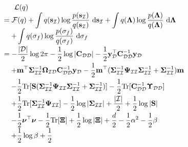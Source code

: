 \documentclass[conference]{IEEEtran}
\begin{document}
	\begin{equation*}
		\hspace{-1.7mm}
		\begin{array}{l}
			\displaystyle\hspace{5mm}\mathcal{L}(q)\vspace{0mm}\\
			\displaystyle= \mathcal{F}(q)+\int q(\mathbf{s}_\mathcal{I})\log\dfrac{p(\mathbf{s}_\mathcal{I})}{q(\mathbf{s}_\mathcal{I})}\ \mathrm{d}\mathbf{s}_\mathcal{I}+
			\int q(\mathbf{\Lambda})\log\dfrac{p(\mathbf{\Lambda})}{q(\mathbf{\Lambda})}\ \mathrm{d}\mathbf{\Lambda}\ \vspace{-0.5mm}\\
			\displaystyle\quad+\int q(\sigma_f)\log\dfrac{p(\sigma_f)}{q(\sigma_f)}\ \mathrm{d}\sigma_f\vspace{0.5mm}\\
			\displaystyle=-\frac{|\mathcal{D}|}{2}\log2\pi-\frac{1}{2}\log|\mathbf{C}_\mathcal{DD}|-\frac{1}{2}\mathbf{y}_\mathcal{D}^\top\mathbf{C}_\mathcal{DD}^{-1}\mathbf{y}_\mathcal{D}\vspace{1mm}\\
			\displaystyle\quad+\mathbf{m}^\top\mathbf{\Sigma}_\mathcal{II}^{-1}\mathbf{\Omega}_\mathcal{ID}\mathbf{C}_\mathcal{DD}^{-1}\mathbf{y}_\mathcal{D}-\frac{1}{2}\mathbf{m}^\top(\mathbf{\Sigma}_\mathcal{II}^{-1}\mathbf{\Psi}_\mathcal{II}\mathbf{\Sigma}_\mathcal{II}^{-1}+\mathbf{\Sigma}_\mathcal{II}^{-1})\mathbf{m}\vspace{1mm}\\
			\displaystyle\quad-\frac{1}{2}\mathrm{Tr}[\mathbf{S}(\mathbf{\Sigma}_\mathcal{II}^{-1}\mathbf{\Psi}_\mathcal{II}\mathbf{\Sigma}_\mathcal{II}^{-1}+ \mathbf{\Sigma}_\mathcal{II}^{-1})]-\frac{1}{2}\mathrm{Tr}[\mathbf{C}_\mathcal{DD}^{-1}\mathbf{\Upsilon}_\mathcal{DD}]\vspace{1mm}\\
			\displaystyle\quad+\frac{1}{2}\mathrm{Tr}[\mathbf{\Sigma}_\mathcal{II}^{-1}\mathbf{\Psi}_\mathcal{II}]-\frac{1}{2}\log|\mathbf{\Sigma}_\mathcal{II}|+\frac{|\mathcal{I}|}{2}+\frac{1}{2}\log|\mathbf{S}|\vspace{1mm}\\
			\displaystyle \quad-\dfrac{1}{2}\boldsymbol{\nu}^\top\boldsymbol{\nu}-\dfrac{1}{2}\mathrm{Tr}[\mathbf{\Xi}]+\dfrac{1}{2}\log|\mathbf{\Xi}|+\dfrac{d}{2}-\dfrac{1}{2}\alpha^2-\dfrac{1}{2}\beta\vspace{0.5mm}\\
			\quad+\dfrac{1}{2}\log \beta+\dfrac{1}{2}\vspace{0.5mm}\\

\end{array}
\end{equation*}
\end{document}
